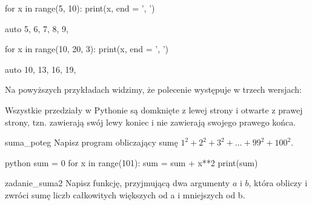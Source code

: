 \documentclass{pdfBooklets}
\begin{document}
\begin{CodeFrame}[python]{0.5\textwidth}
for x in range(5, 10):
    print(x, end = ', ')
\end{CodeFrame}
\begin{CodeFrame}{auto}
5, 6, 7, 8, 9, 
\end{CodeFrame}

\begin{CodeFrame}[python]{0.5\textwidth}
for x in range(10, 20, 3):
    print(x, end = ', ')
\end{CodeFrame}
\begin{CodeFrame}{auto}
10, 13, 16, 19, 
\end{CodeFrame}

\noindent Na powyższych przykładach widzimy, że polecenie  występuje w trzech wersjach:

\begin{ProTip}{}
\normalsize Wszystkie przedziały w Pythonie są domknięte z lewej strony i otwarte z prawej strony,
tzn. zawierają swój lewy koniec i nie zawierają swojego prawego końca.
\end{ProTip}

\begin{Zadanie}{}{suma_poteg}
Napisz program obliczający sumę $1^2 + 2^2 + 3^2 + \ldots + 99^2 + 100^2$. 

\begin{rozwiazanie}{python}
sum = 0
for x in range(101):
    sum = sum + x**2
print(sum)
\end{rozwiazanie}
\end{Zadanie}

\begin{Zadanie}{}{zadanie_suma2}
Napisz funkcję, przyjmującą dwa argumenty $a$ i $b$, która obliczy i zwróci sumę liczb całkowitych większych od a i mniejszych od b.
\end{Zadanie}
\end{document}
